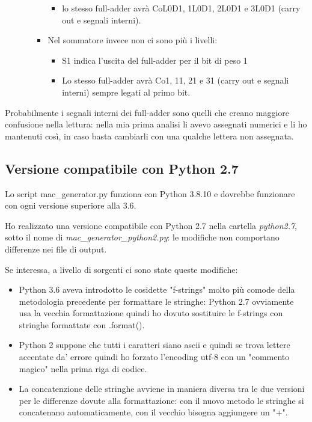 \documentclass[12pt, letterpaper]{article}
\begin{document}
\begin{itemize}
\begin{itemize}
\begin{itemize}
\begin{itemize}
\item lo stesso full-adder avrà CoL0D1, 1L0D1, 2L0D1 e 3L0D1 (carry out e segnali interni).
\end{itemize}
\item Nel sommatore invece non ci sono più i livelli:
\begin{itemize}
\item S1 indica l'uscita del full-adder per il bit di peso 1
\item Lo stesso full-adder avrà Co1, 11, 21 e 31 (carry out e segnali interni) sempre legati al primo bit.
\end{itemize}
\end{itemize}
\end{itemize}
\end{itemize}

Probabilmente i segnali interni dei full-adder sono quelli che creano maggiore confusione nella lettura: nella mia prima analisi li avevo assegnati numerici e li ho mantenuti così, in caso basta cambiarli con una qualche lettera non assegnata.

\subsection{Versione compatibile con Python 2.7}

Lo script mac\_generator.py funziona con Python 3.8.10 e dovrebbe funzionare con ogni versione superiore alla 3.6.

Ho realizzato una versione compatibile con Python 2.7 nella cartella \textit{python2.7}, sotto il nome di \textit{mac\_generator\_python2.py}: le modifiche non comportano differenze nei file di output.

Se interessa, a livello di sorgenti ci sono state queste modifiche:
\begin{itemize}
\item Python 3.6 aveva introdotto le cosidette "f-strings" molto più comode della metodologia precedente per formattare le stringhe: Python 2.7 ovviamente usa la vecchia formattazione quindi ho dovuto sostituire le f-strings con stringhe formattate con .format().
\item Python 2 suppone che tutti i caratteri siano ascii e quindi se trova lettere accentate da' errore quindi ho forzato l'encoding utf-8 con un "commento magico" nella prima riga di codice.
\item La concatenzione delle stringhe avviene in maniera diversa tra le due versioni per le differenze dovute alla formattazione: con il nuovo metodo le stringhe si concatenano automaticamente, con il vecchio bisogna aggiungere un "+".
\end{itemize}
\end{document}
